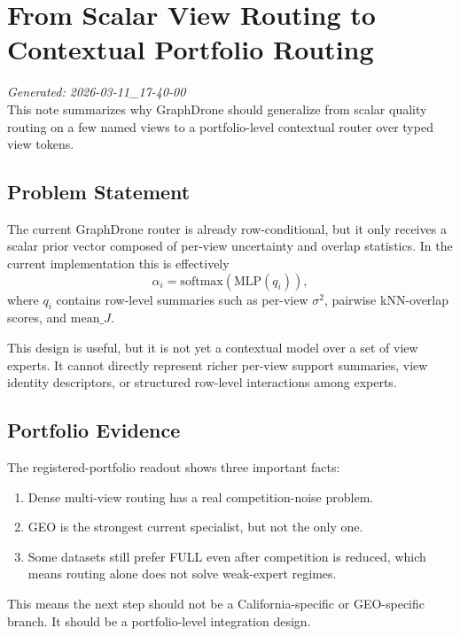 \section{From Scalar View Routing to Contextual Portfolio Routing}

\textit{Generated: 2026-03-11\_17-40-00} \\
This note summarizes why GraphDrone should generalize from scalar quality routing on a few named views to a portfolio-level contextual router over typed view tokens.

\subsection{Problem Statement}

The current GraphDrone router is already row-conditional, but it only receives a scalar prior vector composed of per-view uncertainty and overlap statistics. In the current implementation this is effectively
\[
\alpha_i = \mathrm{softmax}(\mathrm{MLP}(q_i)),
\]
where \(q_i\) contains row-level summaries such as per-view \(\sigma^2\), pairwise kNN-overlap scores, and \(\mathrm{mean}\_J\).

This design is useful, but it is not yet a contextual model over a set of view experts. It cannot directly represent richer per-view support summaries, view identity descriptors, or structured row-level interactions among experts.

\subsection{Portfolio Evidence}



The registered-portfolio readout shows three important facts:

\begin{enumerate}
\item Dense multi-view routing has a real competition-noise problem.
\item GEO is the strongest current specialist, but not the only one.
\item Some datasets still prefer FULL even after competition is reduced, which means routing alone does not solve weak-expert regimes.
\end{enumerate}

This means the next step should not be a California-specific or GEO-specific branch. It should be a portfolio-level integration design.

